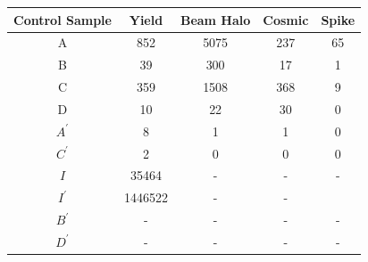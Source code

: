 \vspace{5mm}
\begin{minipage}{0.90\linewidth} 
\begin{center}
\begin{tabular}{c| c| c| c| c }
\toprule
 \hline
\bfseries{Control Sample} & Yield & Beam Halo & Cosmic & Spike \\
\hline
\toprule
\textsf{A} & 852 & 5075 & 237 & 65\\
\textsf{B} & 39 & 300&  17 &  1\\
\textsc{C} & 359 & 1508 & 368 & 9  \\
\textsf{D} & 10 & 22 & 30 & 0 \\
\hline\hline
\textsf{$A^{\prime}$}& 8 &  1& 1 & 0\\ 
\textsf{$C^{\prime}$}& 2 & 0 & 0 & 0\\  
\textsf{$I$} & 35464 & -& - & -\\    
\textsf{$I^{\prime}$}&  1446522 & - & - & \\       
\textsf{$B^{\prime}$}& - &-  & - & -\\    
\textsf{$D^{\prime}$}& - & - & - & -\\      
\hline
\bottomrule
\end{tabular}
\label{tab:EVTYIELD} 
\end{center}
\end{minipage}

